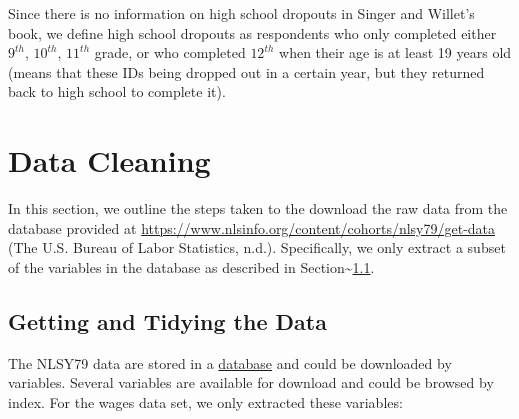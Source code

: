 \documentclass{article}
\begin{document}
Since there is no information on high school dropouts in Singer and Willet's book, we define high school dropouts as respondents who only completed either \(9^{th}\), \(10^{th}\), \(11^{th}\) grade, or who completed \(12^{th}\) when their age is at least 19 years old (means that these IDs being dropped out in a certain year, but they returned back to high school to complete it).

\hypertarget{cleaning}{%
\section{Data Cleaning}\label{cleaning}}

In this section, we outline the steps taken to the download the raw data from the database provided at \url{https://www.nlsinfo.org/content/cohorts/nlsy79/get-data} (The U.S. Bureau of Labor Statistics, n.d.). Specifically, we only extract a subset of the variables in the database as described in Section\textasciitilde{}\ref{getdata}.

\hypertarget{getdata}{%
\subsection{Getting and Tidying the Data}\label{getdata}}

The NLSY79 data are stored in a \href{https://www.nlsinfo.org/content/cohorts/nlsy79/get-data}{database} and could be downloaded by variables. Several variables are available for download and could be browsed by index. For the wages data set, we only extracted these variables:
\end{document}

